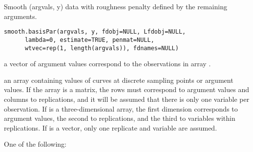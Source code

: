 \documentclass{article}
\begin{document}
\begin{Description}\relax
Smooth (argvals, y) data with roughness penalty defined by the
remaining arguments.
\end{Description}
\begin{Usage}
\begin{verbatim}
smooth.basisPar(argvals, y, fdobj=NULL, Lfdobj=NULL,
      lambda=0, estimate=TRUE, penmat=NULL,
      wtvec=rep(1, length(argvals)), fdnames=NULL)
\end{verbatim}
\end{Usage}
\begin{Arguments}
\begin{ldescription}
\item[\code{argvals}] a vector of argument values correspond to the observations in array
.

\item[\code{y}] an array containing values of curves at discrete sampling points or
argument values. If the array is a matrix, the rows must correspond
to argument values and columns to replications, and it will be
assumed that there is only one variable per observation.  If
 is a three-dimensional array, the first dimension
corresponds to argument values, the second to replications, and the
third to variables within replications.  If  is a vector,
only one replicate and variable are assumed.  

\item[\code{fdobj}] One of the following:

\end{ldescription}
\end{Arguments}
\end{document}
